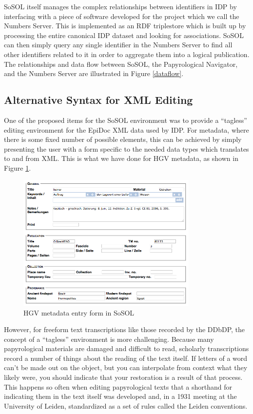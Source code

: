 \documentclass[]{article}
\begin{document}
SoSOL itself manages the complex relationships between identifiers in IDP by interfacing with a piece of software developed for the project which we call the Numbers Server. This is implemented as an RDF triplestore which is built up by processing the entire canonical IDP dataset and looking for associations. SoSOL can then simply query any single identifier in the Numbers Server to find all other identifiers related to it in order to aggregate them into a logical publication. The relationships and data flow between SoSOL, the Papyrological Navigator, and the Numbers Server are illustrated in Figure \ref{dataflow}.

\subsection*{Alternative Syntax for XML Editing}\nocite{xsugar}

One of the proposed items for the SoSOL environment was to provide a “tagless” editing environment for the EpiDoc XML data used by IDP. For metadata, where there is some fixed number of possible elements, this can be achieved by simply presenting the user with a form specific to the needed data types which translates to and from XML. This is what we have done for HGV metadata, as shown in Figure \ref{hgvmeta}.

\begin{figure}[!h]
  \centering
  \includegraphics[width=0.8\textwidth]{images/hgvmeta.png}
  \caption{HGV metadata entry form in SoSOL\label{hgvmeta}}
\end{figure}

However, for freeform text transcriptions like those recorded by the DDbDP, the concept of a “tagless” environment is more challenging. Because many papyrological materials are damaged and difficult to read, scholarly transcriptions record a number of things about the reading of the text itself. If letters of a word can't be made out on the object, but you can interpolate from context what they likely were, you should indicate that your restoration is a result of that process. This happens so often when editing papyrological texts that a shorthand for indicating them in the text itself was developed  and, in a 1931 meeting at the University of Leiden, standardized as a set of rules called the Leiden conventions.
\end{document}
